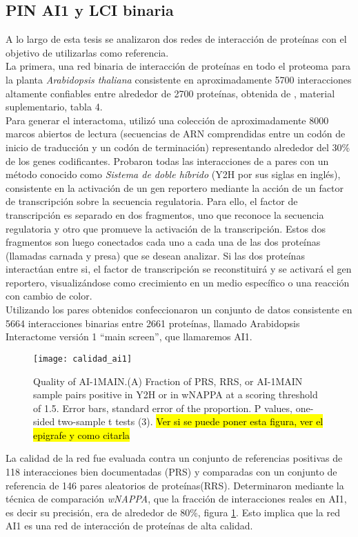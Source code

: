 \subsection{PIN AI1 y LCI binaria}
A lo largo de esta tesis se analizaron dos redes de interacción de proteínas con el objetivo de utilizarlas como referencia.\\
La primera, una red binaria de interacción de proteínas en todo el proteoma para la planta \textit{Arabidopsis thaliana} consistente en aproximadamente 5700 interacciones altamente confiables entre alrededor de 2700 proteínas, obtenida de \cite{Hahn2013}, material suplementario, tabla 4.\\
Para generar el interactoma, \cite{Hahn2013} utilizó una colección de aproximadamente 8000 marcos abiertos de lectura (secuencias de ARN comprendidas entre un codón de inicio de traducción y un codón de terminación) representando alrededor del 30\% de los genes codificantes. Probaron todas las interacciones de a pares con un método conocido como \textit{Sistema de doble híbrido} (Y2H por sus siglas en inglés), consistente en la activación de un gen reportero mediante la acción de un factor de transcripción sobre la secuencia regulatoria. Para ello, el factor de transcripción es separado en dos fragmentos, uno que reconoce la secuencia regulatoria y otro que promueve la activación de la transcripción. Estos dos fragmentos son luego conectados cada uno a cada una de las dos proteínas (llamadas carnada y presa) que se desean analizar. Si las dos proteínas interactúan entre si, el factor de transcripción se reconstituirá y se activará el gen reportero, visualizándose como crecimiento en un medio específico o una reacción con cambio de color.\cite{Bruckner2009}\\
Utilizando los pares obtenidos confeccionaron un conjunto de datos consistente en 5664 interacciones binarias entre 2661 proteínas, llamado Arabidopsis Interactome versión 1 ``main screen'', que llamaremos AI1.\\
\begin{figure}[h]
    \centering
    \texttt{[image: calidad\_ai1]}
    \caption{Quality of AI-1MAIN.(A) Fraction of PRS, RRS, or AI-1MAIN sample pairs positive in Y2H or in wNAPPA at a scoring threshold of 1.5. Error bars, standard error of the proportion. P values, one-sided two-sample t tests (3). \hl{Ver si se puede poner esta figura, ver el epigrafe y como citarla}}
    \label{fig:calidad_ai1}
\end{figure}
La calidad de la red fue evaluada contra un conjunto de referencias positivas de 118 interacciones bien documentadas (PRS) y comparadas con un conjunto de referencia de 146 pares aleatorios de proteínas(RRS). Determinaron mediante la técnica de comparación \textit{wNAPPA}, que la fracción de interacciones reales en AI1, es decir su precisión, era de alrededor de 80\%, figura \ref{fig:calidad_ai1}. Esto implica que la red AI1 es una red de interacción de proteínas de alta calidad.\\
